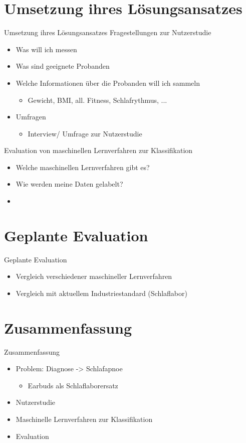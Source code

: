 \documentclass[18pt]{beamer}
\begin{document}
\section{Umsetzung ihres Lösungsansatzes}
\begin{frame}{Umsetzung ihres Lösungsansatzes}
Fragestellungen zur Nutzerstudie
\begin{itemize}
	\item Was will ich messen
	\item Was sind geeignete Probanden
	\item Welche Informationen über die Probanden will ich sammeln
	\begin{itemize}
		\item Gewicht, BMI, all. Fitness, Schlafrythmus, ...
	\end{itemize}
	\item Umfragen
	\begin{itemize}
		\item Interview/ Umfrage zur Nutzerstudie
	\end{itemize}
\end{itemize}
Evaluation von maschinellen Lernverfahren zur Klassifikation
\begin{itemize}
	\item Welche maschinellen Lernverfahren gibt es?
	\item Wie werden meine Daten gelabelt?
	\item 
\end{itemize}
\end{frame}


\section{Geplante Evaluation}
\begin{frame}{Geplante Evaluation}
\begin{itemize}
	\item Vergleich verschiedener maschineller Lernverfahren
	\item Vergleich mit aktuellem Industriestandard (Schlaflabor)
\end{itemize}
\end{frame}

\section{Zusammenfassung}
\begin{frame}{Zusammenfassung}
\begin{itemize}
	\item Problem: Diagnose -> Schlafapnoe
	\begin{itemize}
		\item Earbuds als Schlaflaborersatz
	\end{itemize}
	\item Nutzerstudie
	\item Maschinelle Lernverfahren zur Klassifikation
	\item Evaluation
\end{itemize}
\end{frame}
\end{document}

